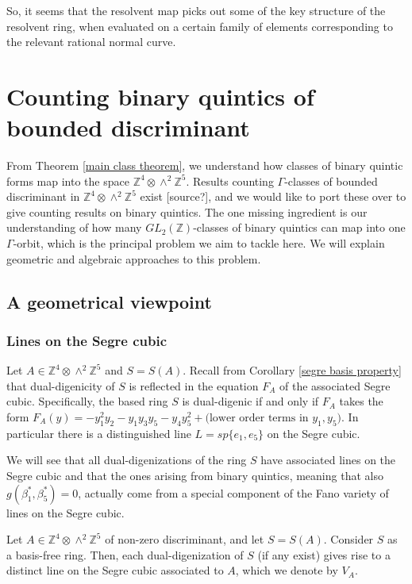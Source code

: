 \documentclass{report}
\begin{document}
So, it seems that the resolvent map picks out some of the key structure of the resolvent ring, when evaluated on a certain family of elements corresponding to the relevant rational normal curve.

\chapter{Counting binary quintics of bounded discriminant}

From Theorem \ref{main class theorem}, we understand how classes of binary quintic forms map into the space $\mathbb{Z}^4 \otimes \wedge^2 \mathbb{Z}^5$.  Results counting $\Gamma$-classes of bounded discriminant in $\mathbb{Z}^4 \otimes \wedge^2 \mathbb{Z}^5$ exist [source?], and we would like to port these over to give counting results on binary quintics.  The one missing ingredient is our understanding of how many $GL_2(\mathbb{Z})$-classes of binary quintics can map into one $\Gamma$-orbit, which is the principal problem we aim to tackle here.  We will explain geometric and algebraic approaches to this problem.

\section{A geometrical viewpoint}

\subsection{Lines on the Segre cubic}

Let $A \in \mathbb{Z}^4 \otimes \wedge^2 \mathbb{Z}^5$ and $S = S(A)$.  Recall from Corollary \ref{segre basis property} that dual-digenicity of $S$ is reflected in the equation $F_A$ of the associated Segre cubic.  Specifically, the based ring $S$ is dual-digenic if and only if $F_A$ takes the form $F_A(y) = - y_1^2 y_2 - y_1 y_3 y_5 - y_4 y_5^2 + \text{(lower order terms in $y_1, y_5$)}$.  In particular there is a distinguished line $L = sp\{e_1,e_5\}$ on the Segre cubic.

We will see that all dual-digenizations of the ring $S$ have associated lines on the Segre cubic and that the ones arising from binary quintics, meaning that also $g(\beta_1^*, \beta_5^*) = 0$, actually come from a special component of the Fano variety of lines on the Segre cubic.

\begin{lemma}
Let $A \in \mathbb{Z}^4 \otimes \wedge^2 \mathbb{Z}^5$ of non-zero discriminant, and let $S = S(A)$.  Consider $S$ as a basis-free ring.  Then, each dual-digenization of $S$ (if any exist) gives rise to a distinct line on the Segre cubic associated to $A$, which we denote by $V_A$.
\end{lemma}
\end{document}
